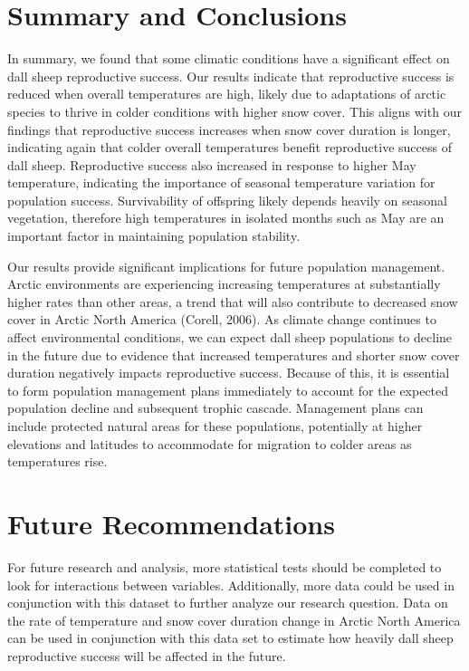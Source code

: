 \documentclass[
  12pt,
]{article}
\begin{document}
\newpage

\hypertarget{summary-and-conclusions}{%
\section{Summary and Conclusions}\label{summary-and-conclusions}}

In summary, we found that some climatic conditions have a significant
effect on dall sheep reproductive success. Our results indicate that
reproductive success is reduced when overall temperatures are high,
likely due to adaptations of arctic species to thrive in colder
conditions with higher snow cover. This aligns with our findings that
reproductive success increases when snow cover duration is longer,
indicating again that colder overall temperatures benefit reproductive
success of dall sheep. Reproductive success also increased in response
to higher May temperature, indicating the importance of seasonal
temperature variation for population success. Survivability of offspring
likely depends heavily on seasonal vegetation, therefore high
temperatures in isolated months such as May are an important factor in
maintaining population stability.

Our results provide significant implications for future population
management. Arctic environments are experiencing increasing temperatures
at substantially higher rates than other areas, a trend that will also
contribute to decreased snow cover in Arctic North America (Corell,
2006). As climate change continues to affect environmental conditions,
we can expect dall sheep populations to decline in the future due to
evidence that increased temperatures and shorter snow cover duration
negatively impacts reproductive success. Because of this, it is
essential to form population management plans immediately to account for
the expected population decline and subsequent trophic cascade.
Management plans can include protected natural areas for these
populations, potentially at higher elevations and latitudes to
accommodate for migration to colder areas as temperatures rise.

\hypertarget{future-recommendations}{%
\section{Future Recommendations}\label{future-recommendations}}

For future research and analysis, more statistical tests should be
completed to look for interactions between variables. Additionally, more
data could be used in conjunction with this dataset to further analyze
our research question. Data on the rate of temperature and snow cover
duration change in Arctic North America can be used in conjunction with
this data set to estimate how heavily dall sheep reproductive success
will be affected in the future.
\end{document}
